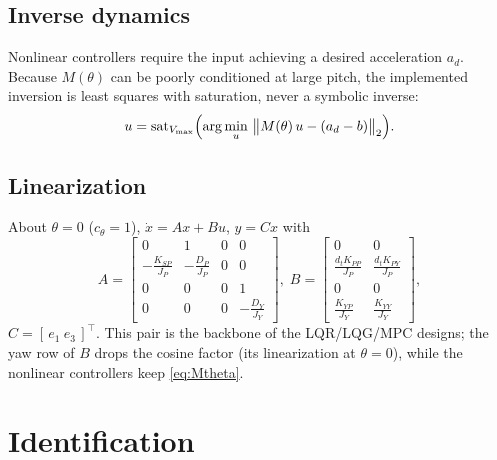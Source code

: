 \documentclass[conference]{IEEEtran}
\newcommand{\sat}{\operatorname{sat}}
\begin{document}
\subsection{Inverse dynamics}
Nonlinear controllers require the input achieving a desired acceleration $a_d$. Because $M(\theta)$ can be poorly conditioned at large pitch, the implemented inversion is least squares with saturation, never a symbolic inverse:
\begin{equation}
u = \sat_{V_{\max}}\Bigl(\arg\min_{u}\ \bigl\|M(\theta)\,u - (a_d - b)\bigr\|_2\Bigr).
\label{eq:invdyn}
\end{equation}

\subsection{Linearization}
About $\theta=0$ ($c_\theta = 1$), $\dot x = Ax + Bu$, $y = Cx$ with
\begin{equation}
A = \begin{bmatrix}
0&1&0&0\\
-\frac{K_{SP}}{J_P}&-\frac{D_P}{J_P}&0&0\\
0&0&0&1\\
0&0&0&-\frac{D_Y}{J_Y}
\end{bmatrix},\;
B = \begin{bmatrix}
0&0\\
\frac{d_tK_{PP}}{J_P}&\frac{d_tK_{PY}}{J_P}\\
0&0\\
\frac{K_{YP}}{J_Y}&\frac{K_{YY}}{J_Y}
\end{bmatrix},
\label{eq:aeroAB}
\end{equation}
$C = [\,e_1\ e_3\,]^{\!\top}$. This pair is the backbone of the LQR/LQG/MPC designs; the yaw row of $B$ drops the cosine factor (its linearization at $\theta=0$), while the nonlinear controllers keep \eqref{eq:Mtheta}.

\section{Identification}\label{sec:id}
\end{document}
